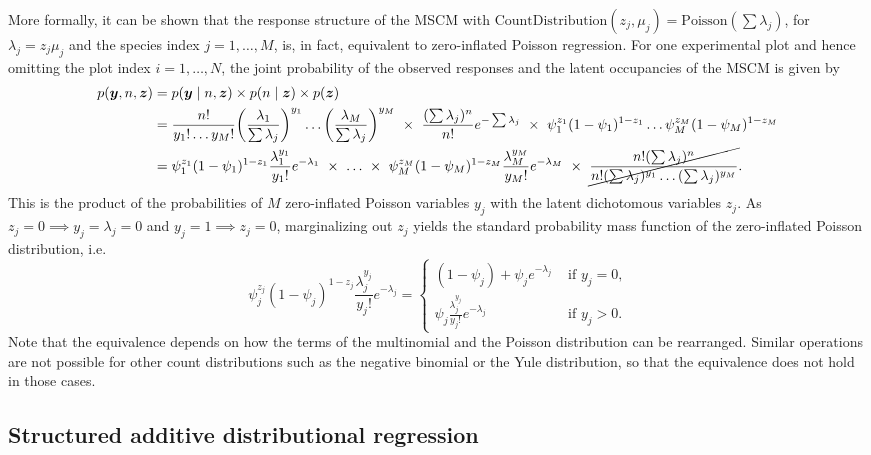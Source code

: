 \documentclass{article}
\newcommand{\yvec}{\bm{y}}
\newcommand{\zvec}{\bm{z}}
\begin{document}
More formally, it can be shown that the response structure of the MSCM with $\text{CountDistribution}(z_j, \mu_j) = \text{Poisson}(\sum\lambda_j)$, for $\lambda_j = z_j\mu_j$ and the species index $j = 1, \dots, M$, is, in fact, equivalent to zero-inflated Poisson regression. For one experimental plot and hence omitting the plot index $i = 1, \dots, N$, the joint probability of the observed responses and the latent occupancies of the MSCM is given by
\begin{align*}
p(\yvec, n, \zvec) &= p(\yvec \mid n, \zvec) \times p(n \mid \zvec) \times p(\zvec) \\
&= \frac{n!}{y_1! \dots y_M!} \biggl(\frac{\lambda_1}{\sum\lambda_j}\biggr)^{y_1} \dots \biggl(\frac{\lambda_M}{\sum\lambda_j}\biggr)^{y_M} \ \times \ \frac{({\sum\lambda_j})^n}{n!} e^{-\sum\lambda_j} \ \times \ \psi_1^{z_1}(1 - \psi_1)^{1 - z_1} \dots \psi_M^{z_M}(1 - \psi_M)^{1 - z_M} \\
&= \psi_1^{z_1}(1 - \psi_1)^{1 - z_1} \frac{\lambda_1^{y_1}}{y_1!} e^{-\lambda_1} \ \times \ \dots \ \times \ \psi_M^{z_M}(1 - \psi_M)^{1 - z_M} \frac{\lambda_M^{y_M}}{y_M!} e^{-\lambda_M} \ \times \ \cancel{\frac{n! ({\sum\lambda_j})^n}{n! (\sum\lambda_j)^{y_1} \dots (\sum\lambda_j)^{y_M}}}.
\end{align*}
This is the product of the probabilities of $M$ zero-inflated Poisson variables $y_j$ with the latent dichotomous variables $z_j$. As $z_j = 0 \implies y_j = \lambda_j = 0$ and $y_j = 1 \implies z_j = 0$, marginalizing out $z_j$ yields the standard probability mass function of the zero-inflated Poisson distribution, i.e.
$$
\psi_j^{z_j}(1 - \psi_j)^{1 - z_j} \frac{\lambda_j^{y_j}}{y_j!} e^{-\lambda_j} =
\begin{cases}
(1 - \psi_j) + \psi_j e^{-\lambda_j}               &\text{ if $y_j = 0$,} \\
\psi_j \frac{\lambda_j^{y_j}}{y_j!} e^{-\lambda_j} &\text{ if $y_j > 0$.}
\end{cases}
$$
Note that the equivalence depends on how the terms of the multinomial and the Poisson distribution can be rearranged. Similar operations are not possible for other count distributions such as the negative binomial or the Yule distribution, so that the equivalence does not hold in those cases.

\subsection{Structured additive distributional regression}
\end{document}
